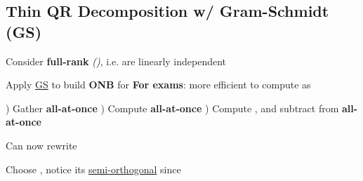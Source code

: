 \subsection*{Thin QR Decomposition w/ Gram-Schmidt (GS)}


Consider \textbf{full-rank}
\emph{()},
i.e. 
are linearly independent

\begin{itemize}

      \vItem
            Apply \underline{GS} 
            to build \textbf{ONB}
            for 
      \vItem
            \textbf{For exams}: more efficient to compute as

            \begin{enumerate}
                  )
                        Gather
                        \textbf{all-at-once}
                  )
                        Compute
                        \textbf{all-at-once}
                  )
                        Compute , and
                        subtract from  \textbf{all-at-once}
            \end{enumerate}
      \vItem
            Can now rewrite
\end{itemize}

\hSep %

Choose
,
notice its \underline{semi-orthogonal} since

